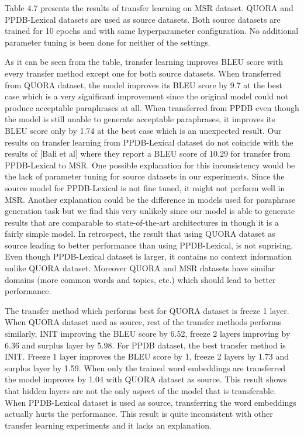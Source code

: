 Table 4.7 presents the results of transfer learning on MSR dataset. QUORA and PPDB-Lexical datasets are used as source datasets. Both source datasets are trained for 10 epochs and with same hyperparameter configuration. No additional parameter tuning is been done for neither of the settings.

As it can be seen from the table, transfer learning improves BLEU score with every transfer method except one for both source datasets. When transferred from QUORA dataset, the model improves its BLEU score by 9.7 at the best case which is a very significant improvement since the original model could not produce acceptable paraphrases at all. When transferred from PPDB even though the model is still unable to generate acceptable paraphrases, it improves its BLEU score only by 1.74 at the best case which is an unexpected result. Our results on transfer learning from PPDB-Lexical dataset do not coincide with the results of [Bali et al] where they report a BLEU score of 10.29 for transfer from PPDB-Lexical to MSR. One possible explanation for this inconsistency would be the lack of parameter tuning for source datasets in our experiments. Since the source model for PPDB-Lexical is not fine tuned, it might not perform well in MSR. Another explanation could be the difference in models used for paraphrase generation task but we find this very unlikely since our model is able to generate results that are comparable to state-of-the-art architectures in though it is a fairly simple model. In retrospect, the result that using QUORA dataset as source leading to better performance than using PPDB-Lexical, is not suprising. Even though PPDB-Lexical dataset is larger, it contains no context information unlike QUORA dataset. Moreover QUORA and MSR datasets have similar domains (more common words and topics, etc.) which should lead to better performance.

The transfer method which performs best for QUORA dataset is freeze 1 layer. When QUORA dataset used as source, rest of the transfer methods performs similarly, INIT improving the BLEU score by 6.52, freeze 2 layers improving by 6.36 and surplus layer by 5.98. For PPDB dataset, the best transfer method is INIT. Freeze 1 layer improves the BLEU score by 1, freeze 2 layers by 1.73 and surplus layer by 1.59. When only the trained word embeddings are transferred the model improves by 1.04 with QUORA dataset as source. This result shows that hidden layers are not the only aspect of the model that is transferable. When PPDB-Lexical dataset is used as source, transferring the word embeddings actually hurts the performance. This result is quite inconsistent with other transfer learning experiments and it lacks an explanation.

